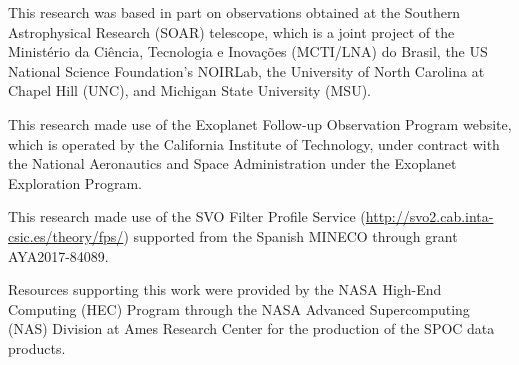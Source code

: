 \documentclass[12pt,twocolumn,tighten]{aastex63}
\begin{document}
%
%

This research was based in part on observations obtained at the
Southern Astrophysical Research (SOAR) telescope, which is a joint
project of the Minist\'{e}rio da Ci\^{e}ncia, Tecnologia e
Inova\c{c}\~{o}es (MCTI/LNA) do Brasil, the US National Science
Foundation's NOIRLab, the University of North Carolina at Chapel Hill
(UNC), and Michigan State University (MSU).

This research made use of the Exoplanet Follow-up Observation
Program website, which is operated by the California Institute of
Technology, under contract with the National Aeronautics and Space
Administration under the Exoplanet Exploration Program.

This research made use of the SVO Filter Profile Service
(\url{http://svo2.cab.inta-csic.es/theory/fps/}) supported from the Spanish
MINECO through grant AYA2017-84089.

Resources supporting this work were provided by the NASA High-End
Computing (HEC) Program through the NASA Advanced Supercomputing (NAS)
Division at Ames Research Center for the production of the SPOC data
products.
%
\end{document}
